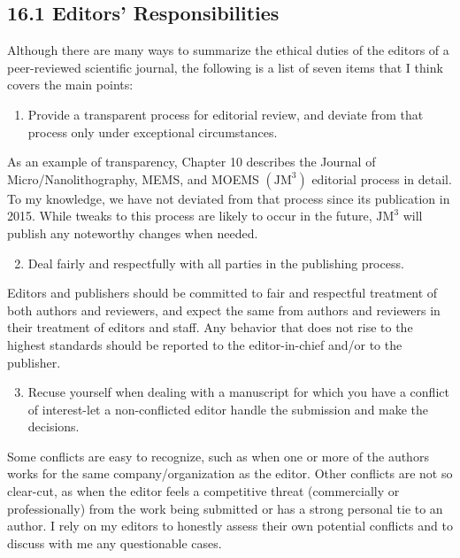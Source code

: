 \subsection*{16.1 Editors' Responsibilities}
Although there are many ways to summarize the ethical duties of the editors of a peer-reviewed scientific journal, the following is a list of seven items that I think covers the main points:

\begin{enumerate}
  \item Provide a transparent process for editorial review, and deviate from that process only under exceptional circumstances.
\end{enumerate}

As an example of transparency, Chapter 10 describes the Journal of Micro/Nanolithography, MEMS, and MOEMS $\left(\mathrm{JM}^{3}\right)$ editorial process in detail. To my knowledge, we have not deviated from that process since its publication in 2015. While tweaks to this process are likely to occur in the future, $\mathrm{JM}^{3}$ will publish any noteworthy changes when needed.

\begin{enumerate}
  \setcounter{enumi}{1}
  \item Deal fairly and respectfully with all parties in the publishing process.
\end{enumerate}

Editors and publishers should be committed to fair and respectful treatment of both authors and reviewers, and expect the same from authors and reviewers in their treatment of editors and staff. Any behavior that does not rise to the highest standards should be reported to the editor-in-chief and/or to the publisher.

\begin{enumerate}
  \setcounter{enumi}{2}
  \item Recuse yourself when dealing with a manuscript for which you have a conflict of interest-let a non-conflicted editor handle the submission and make the decisions.
\end{enumerate}

Some conflicts are easy to recognize, such as when one or more of the authors works for the same company/organization as the editor. Other conflicts are not so clear-cut, as when the editor feels a competitive threat (commercially or professionally) from the work being submitted or has a strong personal tie to an author. I rely on my editors to honestly assess their own potential conflicts and to discuss with me any questionable cases.


